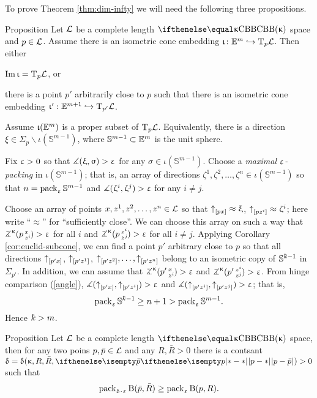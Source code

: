 To prove Theorem \ref{thm:dim-infty}  we will need the following three propositions.


\begin{thm}{Proposition}\label{E=T}
Let $\mathcal{L}$ be a complete length $\Alex{\kappa}$ space and $p\in \spc{L}$.
Assume there is an isometric cone embedding $\iota\:\EE^{m}\hookrightarrow \T_p\spc{L}$.  Then either
\begin{subthm}{}
 $\mathop{\rm Im}\nolimits\upiota=\text{\rm T}_p\mathcal{L}$, or
\end{subthm}

\begin{subthm}{} there is a point $p'$ arbitrarily close to $p$ such that there is an isometric cone embedding $\iota':\EE^{m+1}\hookrightarrow \T_{p'}\spc{L}$.
\end{subthm}
\end{thm}


Assume $\upiota(\mathbb{E}^{m})$ is a proper subset of $\text{\rm T}_p\mathcal{L}$.
Equivalently, there is a direction $\xi \in \Sigma_p\backslash\iota(\mathbb{S}^{m-1})$,
where $\mathbb{S}^{m-1}\subset \EE^m$ is the unit sphere. 

Fix $\upvarepsilon>0$ so that $\measuredangle(\upxi,\upsigma)>\upvarepsilon$ for any $\sigma\in \iota(\mathbb{S}^{m-1})$. 
Choose a \emph{maximal $\upvarepsilon$-packing} in $\iota(\mathbb{S}^{m-1})$;
that is, an array of directions $\zeta^1,\zeta^2,\dots,\zeta^n\in \iota(\mathbb{S}^{m-1})$ so that $n=\mathop{\rm pack}\nolimits_\upvarepsilon \mathbb{S}^{m-1}$ and $\measuredangle(\upzeta^i,\upzeta^j)>\upvarepsilon$ for any $i\not=j$.

Choose an array of points $x,z^1,z^2,\dots,z^n\in\spc{L}$ so that
$\dir p x\approx\xi$, $\dir p{z^i}\approx\zeta^i$;
here write ``$\approx$'' for ``sufficiently close''.
We can choose this array on such a way that 
$\angk{\kappa}p x{z^i}>\eps$ for all $i$ 
and $\angk{\kappa}p{z^i}{z^j}>\eps$ for all $i\not=j$.
Applying Corollary \ref{cor:euclid-subcone}, we can find a point $p'$ arbitrary close to  $p$ 
so that all directions ${\uparrow}_{[{p'}{x}]}$, ${\uparrow}_{[{p'}{z^1}]}$, $\dir{p'}{z^2},\dots,\dir{p'}{z^n}$
belong to an isometric copy of $\mathbb{S}^{\kay-1}$ in $\Sigma_{p'}$.
In addition, we can assume that $\angk{\kappa}{p'}x{z^i}>\eps$ and $\angk{\kappa}{p'}{z^i}{z^j}>\eps$.
From hinge comparison (\ref{angle}),
$\measuredangle({\uparrow}_{[{p'}{x}]},{\uparrow}_{[{p'}{z^i}]})>\upvarepsilon$ 
and $\measuredangle({\uparrow}_{[{p'}{z^i}]},{\uparrow}_{[{p'}{z^j}]})>\upvarepsilon$;
that is, 
\[\pack_\eps \mathbb{S}^{\kay-1}\ge n+1>\pack_\eps \mathbb{S}^{m-1}.\] 
Hence $\kay>m$.
\qeds


\begin{thm}{Proposition}\label{pack-homogeneus}
Let $\mathcal{L}$ be a complete length $\Alex{\kappa}$ space, then 
 for any two poins $p,\bar p\in \spc{L}$ and any $R,\bar R>0$ there is a contsant $\delta=\delta(\kappa,R,\bar R,\dist{p}{\bar p}{})>0$ such that
\[\pack_{\delta\cdot\eps}\oBall(\bar p,\bar R)\ge \pack_{\eps}\oBall(p,R).\]

\end{thm}

